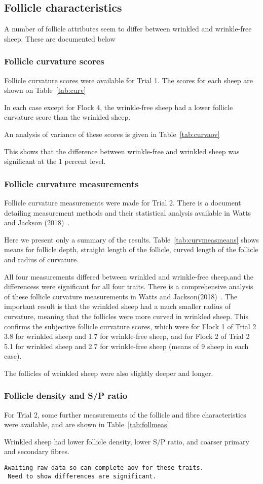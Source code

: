 \documentclass[titlepage]{article}  %
\begin{document}
\subsection{Follicle characteristics}
A number of follicle attributes seem to differ between wrinkled and wrinkle-free sheep. These are documented below

\subsubsection{Follicle curvature scores}
Follicle curvature scores were available for Trial 1. The scores for each sheep are shown on Table~\ref{tab:curv}

In each case except for Flock 4, the wrinkle-free sheep had a lower follicle curvature score than the wrinkled sheep.

An analysis of variance of these scores is given in Table~\ref{tab:curvaov}

This shows that the difference between wrinkle-free and wrinkled sheep was significant at the 1 percent level.

\subsubsection{Follicle curvature measurements}
Follicle curvature measurements were made for Trial 2. There is a document detailing measurement methods and their statistical analysis available in Watts and Jackson (2018)~\cite{watt:18}. 

Here we present only a summary of the results. Table~\ref{tab:curvmeasmeans} shows means for follicle depth, straight length of the follicle, curved length of the follicle and radius of curvature. 

All four measurements differed between wrinkled and wrinkle-free sheep,and the differencess were significant for all four traits.
There is a comprehensive analysis of these follicle curvature measurements in Watts and Jackson(2018)~\cite{watt:18}. 
The important result is that the wrinkled sheep had a much smaller radius of curvature, meaning that the follicles were more curved in wrinkled sheep. This confirms the subjective follicle curvature scores, which were for Flock 1 of Trial 2 3.8 for wrinkled sheep and 1.7 for wrinkle-free sheep, and for Flock 2 of Trial 2 5.1 for wrinkled sheep and 2.7 for wrinkle-free sheep (means of 9 sheep in each case).

 The follicles of wrinkled sheep were also slightly deeper and longer. 

\subsubsection{Follicle density and S/P ratio}
For Trial 2, some further measurements of the follicle and fibre characteristics were available, and are shown in Table~\ref{tab:follmeas}

Wrinkled sheep had lower follicle density, lower S/P ratio, and coarser primary and secondary fibres.
\begin{verbatim}
Awaiting raw data so can complete aov for these traits.
 Need to show differences are significant.
\end{verbatim}
\end{document}
